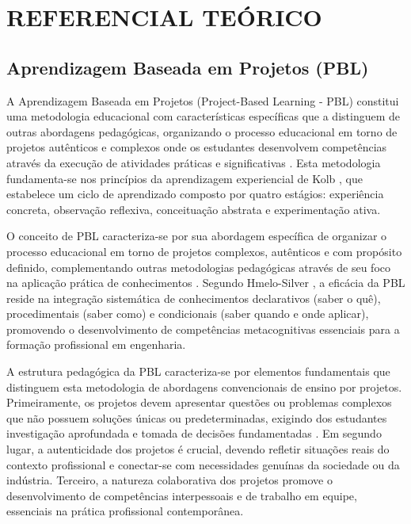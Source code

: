 \documentclass[12pt,a4paper]{article}
\begin{document}
\section{REFERENCIAL TEÓRICO}

\subsection{Aprendizagem Baseada em Projetos (PBL)}

A Aprendizagem Baseada em Projetos (Project-Based Learning - PBL) constitui uma metodologia educacional com características específicas que a distinguem de outras abordagens pedagógicas, organizando o processo educacional em torno de projetos autênticos e complexos onde os estudantes desenvolvem competências através da execução de atividades práticas e significativas \cite{thomas2000, savery2015}. Esta metodologia fundamenta-se nos princípios da aprendizagem experiencial de Kolb \cite{kolb1984}, que estabelece um ciclo de aprendizado composto por quatro estágios: experiência concreta, observação reflexiva, conceituação abstrata e experimentação ativa.

O conceito de PBL caracteriza-se por sua abordagem específica de organizar o processo educacional em torno de projetos complexos, autênticos e com propósito definido, complementando outras metodologias pedagógicas através de seu foco na aplicação prática de conhecimentos \cite{duch2001}. Segundo Hmelo-Silver \cite{hmelo2004}, a eficácia da PBL reside na integração sistemática de conhecimentos declarativos (saber o quê), procedimentais (saber como) e condicionais (saber quando e onde aplicar), promovendo o desenvolvimento de competências metacognitivas essenciais para a formação profissional em engenharia.

A estrutura pedagógica da PBL caracteriza-se por elementos fundamentais que distinguem esta metodologia de abordagens convencionais de ensino por projetos. Primeiramente, os projetos devem apresentar questões ou problemas complexos que não possuem soluções únicas ou predeterminadas, exigindo dos estudantes investigação aprofundada e tomada de decisões fundamentadas \cite{savery2015}. Em segundo lugar, a autenticidade dos projetos é crucial, devendo refletir situações reais do contexto profissional e conectar-se com necessidades genuínas da sociedade ou da indústria. Terceiro, a natureza colaborativa dos projetos promove o desenvolvimento de competências interpessoais e de trabalho em equipe, essenciais na prática profissional contemporânea.
\end{document}

